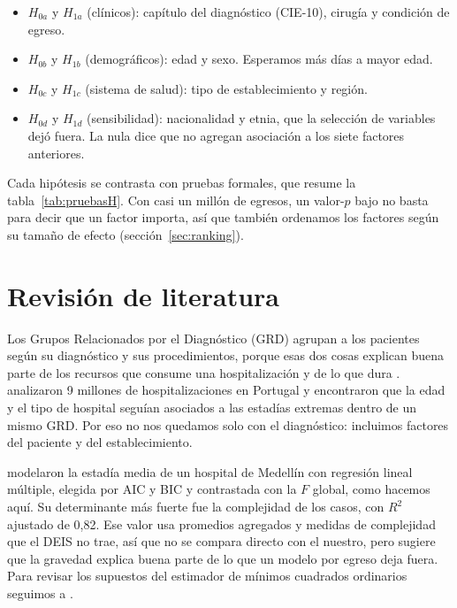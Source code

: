 \documentclass[10.5pt,a4paper,headings=small,abstract=false,bibliography=totoc,listof=totoc]{scrartcl}
\newcommand{\cie}{\mbox{CIE-10}}
\begin{document}
\begin{itemize}\setlength\itemsep{0pt}
\item $H_{0a}$ y $H_{1a}$ (clínicos): capítulo del diagnóstico (\cie), cirugía y condición de egreso.
\item $H_{0b}$ y $H_{1b}$ (demográficos): edad y sexo. Esperamos más días a mayor edad.
\item $H_{0c}$ y $H_{1c}$ (sistema de salud): tipo de establecimiento y región.
\item $H_{0d}$ y $H_{1d}$ (sensibilidad): nacionalidad y etnia, que la selección de variables dejó fuera. La nula dice que no agregan asociación a los siete factores anteriores.
\end{itemize}

Cada hipótesis se contrasta con pruebas formales, que resume la tabla~\ref{tab:pruebasH}. Con casi un millón de egresos, un valor-$p$ bajo no basta para decir que un factor importa, así que también ordenamos los factores según su tamaño de efecto (sección~\ref{sec:ranking}).

\section{Revisión de literatura}

Los Grupos Relacionados por el Diagnóstico (GRD) agrupan a los pacientes según su diagnóstico y sus procedimientos, porque esas dos cosas explican buena parte de los recursos que consume una hospitalización y de lo que dura \citep{fetter1980}. \citet{freitas2012} analizaron 9 millones de hospitalizaciones en Portugal y encontraron que la edad y el tipo de hospital seguían asociados a las estadías extremas dentro de un mismo GRD. Por eso no nos quedamos solo con el diagnóstico: incluimos factores del paciente y del establecimiento.

\citet{gomez2023} modelaron la estadía media de un hospital de Medellín con regresión lineal múltiple, elegida por AIC y BIC y contrastada con la $F$ global, como hacemos aquí. Su determinante más fuerte fue la complejidad de los casos, con $R^2$ ajustado de 0,82. Ese valor usa promedios agregados y medidas de complejidad que el DEIS no trae, así que no se compara directo con el nuestro, pero sugiere que la gravedad explica buena parte de lo que un modelo por egreso deja fuera. Para revisar los supuestos del estimador de mínimos cuadrados ordinarios seguimos a \citet{rodriguez2017}.
\end{document}
